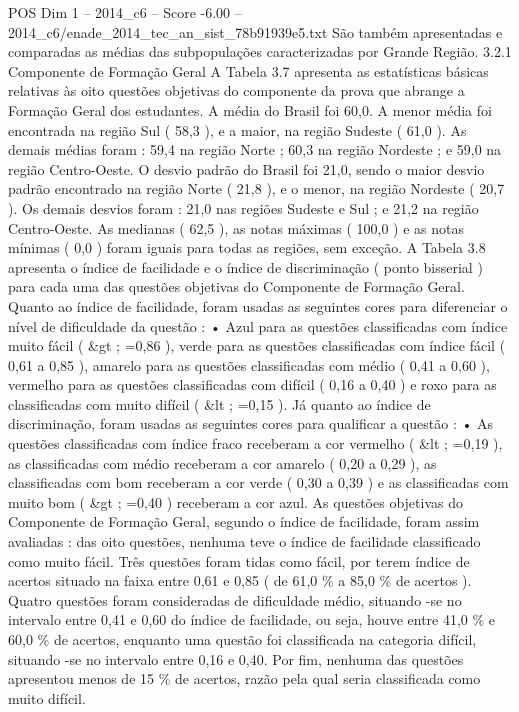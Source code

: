 \begin{textsample}{POS Dim 1 – 2014\_c6 – Score -6.00 – 2014\_c6/enade\_2014\_tec\_an\_sist\_78b91939e5.txt}
São também apresentadas e comparadas as médias das subpopulações caracterizadas por Grande Região. 3.2.1 Componente de Formação Geral A Tabela 3.7 apresenta as estatísticas básicas relativas às oito questões objetivas do componente da prova que abrange a Formação Geral dos estudantes.
A média do Brasil foi 60,0.
A menor média foi encontrada na região Sul ( 58,3 ), e a maior, na região Sudeste ( 61,0 ).
As demais médias foram : 59,4 na região Norte ; 60,3 na região Nordeste ; e 59,0 na região Centro-Oeste.
O desvio padrão do Brasil foi 21,0, sendo o maior desvio padrão encontrado na região Norte ( 21,8 ), e o menor, na região Nordeste ( 20,7 ).
Os demais desvios foram : 21,0 nas regiões Sudeste e Sul ; e 21,2 na região Centro-Oeste.
As medianas ( 62,5 ), as notas máximas ( 100,0 ) e as notas mínimas ( 0,0 ) foram iguais para todas as regiões, sem exceção.
A Tabela 3.8 apresenta o índice de facilidade e o índice de discriminação ( ponto bisserial ) para cada uma das questões objetivas do Componente de Formação Geral.
Quanto ao índice de facilidade, foram usadas as seguintes cores para diferenciar o nível de dificuldade da questão : • Azul para as questões classificadas com índice muito fácil ( \&gt ; =0,86 ), verde para as questões classificadas com índice fácil ( 0,61 a 0,85 ), amarelo para as questões classificadas com médio ( 0,41 a 0,60 ), vermelho para as questões classificadas com difícil ( 0,16 a 0,40 ) e roxo para as classificadas com muito difícil ( \&lt ; =0,15 ).
Já quanto ao índice de discriminação, foram usadas as seguintes cores para qualificar a questão : • As questões classificadas com índice fraco receberam a cor vermelho ( \&lt ; =0,19 ), as classificadas com médio receberam a cor amarelo ( 0,20 a 0,29 ), as classificadas com bom receberam a cor verde ( 0,30 a 0,39 ) e as classificadas com muito bom ( \&gt ; =0,40 ) receberam a cor azul.
As questões objetivas do Componente de Formação Geral, segundo o índice de facilidade, foram assim avaliadas : das oito questões, nenhuma teve o índice de facilidade classificado como muito fácil.
Três questões foram tidas como fácil, por terem índice de acertos situado na faixa entre 0,61 e 0,85 ( de 61,0 \% a 85,0 \% de acertos ).
Quatro questões foram consideradas de dificuldade médio, situando -se no intervalo entre 0,41 e 0,60 do índice de facilidade, ou seja, houve entre 41,0 \% e 60,0 \% de acertos, enquanto uma questão foi classificada na categoria difícil, situando -se no intervalo entre 0,16 e 0,40.
Por fim, nenhuma das questões apresentou menos de 15 \% de acertos, razão pela qual seria classificada como muito difícil.

\end{textsample}
